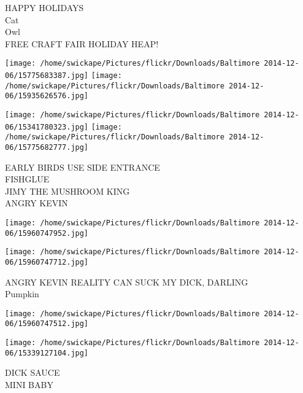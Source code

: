 \documentclass[10pt,letterpaper]{article}
\begin{document}
HAPPY HOLIDAYS\\
Cat\\
Owl\\
FREE CRAFT FAIR HOLIDAY HEAP!
\pagebreak

\texttt{[image: /home/swickape/Pictures/flickr/Downloads/Baltimore 2014-12-06/15775683387.jpg]}
\texttt{[image: /home/swickape/Pictures/flickr/Downloads/Baltimore 2014-12-06/15935626576.jpg]}

\texttt{[image: /home/swickape/Pictures/flickr/Downloads/Baltimore 2014-12-06/15341780323.jpg]}
\texttt{[image: /home/swickape/Pictures/flickr/Downloads/Baltimore 2014-12-06/15775682777.jpg]}

EARLY BIRDS USE SIDE ENTRANCE\\
FISHGLUE\\
JIMY THE MUSHROOM KING\\
ANGRY KEVIN
\pagebreak

\texttt{[image: /home/swickape/Pictures/flickr/Downloads/Baltimore 2014-12-06/15960747952.jpg]}

\vspace{0.25in}
\texttt{[image: /home/swickape/Pictures/flickr/Downloads/Baltimore 2014-12-06/15960747712.jpg]}

ANGRY KEVIN REALITY CAN SUCK MY DICK, DARLING\\
Pumpkin
\pagebreak

\texttt{[image: /home/swickape/Pictures/flickr/Downloads/Baltimore 2014-12-06/15960747512.jpg]}

\vspace{0.25in}
\texttt{[image: /home/swickape/Pictures/flickr/Downloads/Baltimore 2014-12-06/15339127104.jpg]}

DICK SAUCE\\
MINI BABY
\pagebreak
\end{document}

